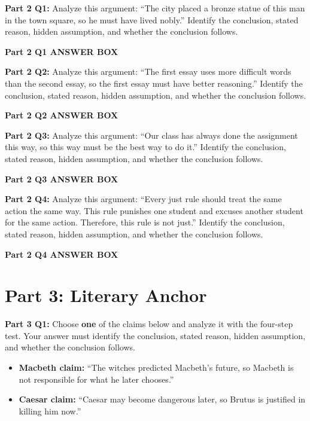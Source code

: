 \documentclass[12pt]{article}
\newcommand{\answerbox}[2]{%
\vspace{0.15em}
\noindent\textbf{#1}\par
\vspace{0.05em}
\noindent\fbox{%
\begin{minipage}[t][#2]{\dimexpr\textwidth-2\fboxsep-2\fboxrule}
\rule{\textwidth}{0pt}
\vspace{#2}
\end{minipage}
}\par
\vspace{0.25em}
}
\begin{document}
\textbf{Part 2 Q1:} Analyze this argument: ``The city placed a bronze statue of this man in the town square, so he must have lived nobly.'' Identify the conclusion, stated reason, hidden assumption, and whether the conclusion follows.

\answerbox{Part 2 Q1 ANSWER BOX}{2.45in}

\textbf{Part 2 Q2:} Analyze this argument: ``The first essay uses more difficult words than the second essay, so the first essay must have better reasoning.'' Identify the conclusion, stated reason, hidden assumption, and whether the conclusion follows.

\answerbox{Part 2 Q2 ANSWER BOX}{2.45in}

\newpage

\textbf{Part 2 Q3:} Analyze this argument: ``Our class has always done the assignment this way, so this way must be the best way to do it.'' Identify the conclusion, stated reason, hidden assumption, and whether the conclusion follows.

\answerbox{Part 2 Q3 ANSWER BOX}{2.45in}

\textbf{Part 2 Q4:} Analyze this argument: ``Every just rule should treat the same action the same way. This rule punishes one student and excuses another student for the same action. Therefore, this rule is not just.'' Identify the conclusion, stated reason, hidden assumption, and whether the conclusion follows.

\answerbox{Part 2 Q4 ANSWER BOX}{2.45in}

\newpage

\section*{Part 3: Literary Anchor}

\textbf{Part 3 Q1:} Choose \textbf{one} of the claims below and analyze it with the four-step test. Your answer must identify the conclusion, stated reason, hidden assumption, and whether the conclusion follows.

\begin{itemize}[leftmargin=*, itemsep=0.08em, topsep=0.08em, parsep=0pt]
\item \textbf{Macbeth claim:} ``The witches predicted Macbeth's future, so Macbeth is not responsible for what he later chooses.''
\item \textbf{Caesar claim:} ``Caesar may become dangerous later, so Brutus is justified in killing him now.''
\end{itemize}
\end{document}
